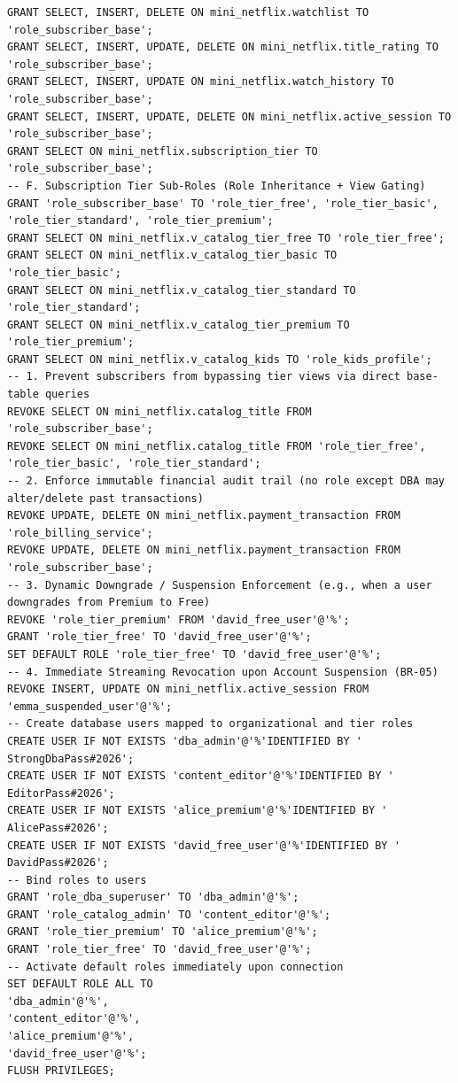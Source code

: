 \begin{lstlisting}[style=reportsql,title={Roles and privileges}]
GRANT SELECT, INSERT, DELETE ON mini_netflix.watchlist TO 'role_subscriber_base';
GRANT SELECT, INSERT, UPDATE, DELETE ON mini_netflix.title_rating TO 'role_subscriber_base';
GRANT SELECT, INSERT, UPDATE ON mini_netflix.watch_history TO 'role_subscriber_base';
GRANT SELECT, INSERT, UPDATE, DELETE ON mini_netflix.active_session TO 'role_subscriber_base';
GRANT SELECT ON mini_netflix.subscription_tier TO 'role_subscriber_base';
-- F. Subscription Tier Sub-Roles (Role Inheritance + View Gating)
GRANT 'role_subscriber_base' TO 'role_tier_free', 'role_tier_basic', 'role_tier_standard', 'role_tier_premium';
GRANT SELECT ON mini_netflix.v_catalog_tier_free TO 'role_tier_free';
GRANT SELECT ON mini_netflix.v_catalog_tier_basic TO 'role_tier_basic';
GRANT SELECT ON mini_netflix.v_catalog_tier_standard TO 'role_tier_standard';
GRANT SELECT ON mini_netflix.v_catalog_tier_premium TO 'role_tier_premium';
GRANT SELECT ON mini_netflix.v_catalog_kids TO 'role_kids_profile';
-- 1. Prevent subscribers from bypassing tier views via direct base-table queries
REVOKE SELECT ON mini_netflix.catalog_title FROM 'role_subscriber_base';
REVOKE SELECT ON mini_netflix.catalog_title FROM 'role_tier_free', 'role_tier_basic', 'role_tier_standard';
-- 2. Enforce immutable financial audit trail (no role except DBA may alter/delete past transactions)
REVOKE UPDATE, DELETE ON mini_netflix.payment_transaction FROM 'role_billing_service';
REVOKE UPDATE, DELETE ON mini_netflix.payment_transaction FROM 'role_subscriber_base';
-- 3. Dynamic Downgrade / Suspension Enforcement (e.g., when a user downgrades from Premium to Free)
REVOKE 'role_tier_premium' FROM 'david_free_user'@'%';
GRANT 'role_tier_free' TO 'david_free_user'@'%';
SET DEFAULT ROLE 'role_tier_free' TO 'david_free_user'@'%';
-- 4. Immediate Streaming Revocation upon Account Suspension (BR-05)
REVOKE INSERT, UPDATE ON mini_netflix.active_session FROM 'emma_suspended_user'@'%';
-- Create database users mapped to organizational and tier roles
CREATE USER IF NOT EXISTS 'dba_admin'@'%'IDENTIFIED BY ' StrongDbaPass#2026';
CREATE USER IF NOT EXISTS 'content_editor'@'%'IDENTIFIED BY ' EditorPass#2026';
CREATE USER IF NOT EXISTS 'alice_premium'@'%'IDENTIFIED BY ' AlicePass#2026';
CREATE USER IF NOT EXISTS 'david_free_user'@'%'IDENTIFIED BY ' DavidPass#2026';
-- Bind roles to users
GRANT 'role_dba_superuser' TO 'dba_admin'@'%';
GRANT 'role_catalog_admin' TO 'content_editor'@'%';
GRANT 'role_tier_premium' TO 'alice_premium'@'%';
GRANT 'role_tier_free' TO 'david_free_user'@'%';
-- Activate default roles immediately upon connection
SET DEFAULT ROLE ALL TO
'dba_admin'@'%',
'content_editor'@'%',
'alice_premium'@'%',
'david_free_user'@'%';
FLUSH PRIVILEGES;
\end{lstlisting}

